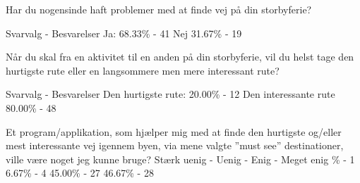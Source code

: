 Har du nogensinde haft problemer med at finde vej på din storbyferie?

Svarvalg - Besvarelser \newline
Ja: 
68.33\%  -  41 \newline
Nej
31.67\%  -  19

Når du skal fra en aktivitet til en anden på din storbyferie, vil du helst tage den hurtigste rute eller en langsommere men mere interessant rute?

Svarvalg - Besvarelser \newline
Den hurtigste rute:
20.00\%  -  12 \newline
Den interessante rute
80.00\%  -  48 

Et program/applikation, som hjælper mig med at finde den hurtigste og/eller mest interessante vej igennem byen, via mene valgte ”must see” destinationer, ville være noget jeg kunne bruge? \newline
Stærk uenig   -    Uenig    -     Enig    -    Meget enig \%  -  1
6.67\%  -  4
45.00\%  -  27
46.67\%  -  28


